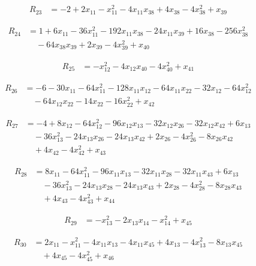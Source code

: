 \documentclass[11pt,letterpaper]{article}
\theoremstyle{definition}
\theoremstyle{remark}
\begin{document}
\begin{align*}
R_{23} &= -2 +2 x_{11} -x_{11}^{2} -4 x_{11} x_{38} +4 x_{38} -4 x_{38}^{2} +x_{39}
\end{align*}

\begin{align*}
R_{24} &= 1 +6 x_{11} -36 x_{11}^{2} -192 x_{11} x_{38} -24 x_{11} x_{39} +16 x_{38} -256 x_{38}^{2} \\
&\quad -64 x_{38} x_{39} +2 x_{39} -4 x_{39}^{2} +x_{40}
\end{align*}

\begin{align*}
R_{25} &= -x_{12}^{2} -4 x_{12} x_{40} -4 x_{40}^{2} +x_{41}
\end{align*}

\begin{align*}
R_{26} &= -6 -30 x_{11} -64 x_{11}^{2} -128 x_{11} x_{12} -64 x_{11} x_{22} -32 x_{12} -64 x_{12}^{2} \\
&\quad -64 x_{12} x_{22} -14 x_{22} -16 x_{22}^{2} +x_{42}
\end{align*}

\begin{align*}
R_{27} &= -4 +8 x_{12} -64 x_{12}^{2} -96 x_{12} x_{13} -32 x_{12} x_{26} -32 x_{12} x_{42} +6 x_{13} \\
&\quad -36 x_{13}^{2} -24 x_{13} x_{26} -24 x_{13} x_{42} +2 x_{26} -4 x_{26}^{2} -8 x_{26} x_{42} \\
&\quad +4 x_{42} -4 x_{42}^{2} +x_{43}
\end{align*}

\begin{align*}
R_{28} &= 8 x_{11} -64 x_{11}^{2} -96 x_{11} x_{13} -32 x_{11} x_{28} -32 x_{11} x_{43} +6 x_{13} \\
&\quad -36 x_{13}^{2} -24 x_{13} x_{28} -24 x_{13} x_{43} +2 x_{28} -4 x_{28}^{2} -8 x_{28} x_{43} \\
&\quad +4 x_{43} -4 x_{43}^{2} +x_{44}
\end{align*}

\begin{align*}
R_{29} &= -x_{13}^{2} -2 x_{13} x_{14} -x_{14}^{2} +x_{45}
\end{align*}

\begin{align*}
R_{30} &= 2 x_{11} -x_{11}^{2} -4 x_{11} x_{13} -4 x_{11} x_{45} +4 x_{13} -4 x_{13}^{2} -8 x_{13} x_{45} \\
&\quad +4 x_{45} -4 x_{45}^{2} +x_{46}
\end{align*}
\end{document}
